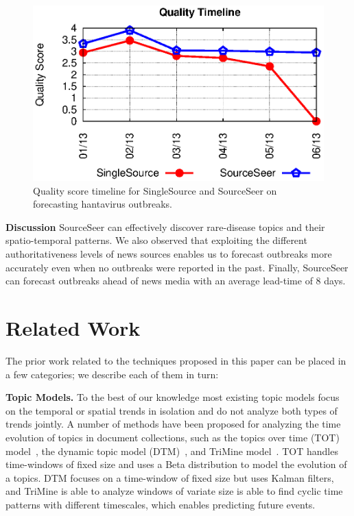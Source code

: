 \documentclass[twoside,leqno,twocolumn]{article}
\newcommand{\fullmodel}{{{\sf SourceSeer}}\xspace}
\newcommand{\fullsingle}{{{\sf SingleSource}}\xspace}
\begin{document}
\begin{figure} [h]
\begin{center}
	\includegraphics[clip,scale=0.6]{fig/quality_bench.eps}
\end{center}
\caption{Quality score timeline for \fullsingle and \fullmodel on forecasting hantavirus outbreaks.}
 \label{fig:bench_qual}
\end{figure}


\vspace{2pt}\noindent\textbf{Discussion}
\fullmodel can effectively discover rare-disease topics and their spatio-temporal patterns. We also observed that exploiting the different authoritativeness levels of news sources enables us to forecast outbreaks more accurately even when no outbreaks were reported in the past. Finally, \fullmodel can forecast outbreaks ahead of news media with an average lead-time of 8 days.

\section{Related Work}
\label{sec:related_work}
The prior work related to the techniques proposed in this paper can be placed in a few categories; we describe each of them in turn:

\vspace{5pt}\noindent\textbf{Topic Models.} To the best of our knowledge most existing topic models focus on the temporal or spatial trends in isolation and do not analyze both types of trends jointly.  A number of methods have been proposed for analyzing the time evolution of topics in document collections, such as the topics over time (TOT) model~\cite{wang:2006}, the dynamic topic model (DTM)~\cite{blei:2006}, and TriMine model~\cite{matsubara:2012}. TOT handles time-windows of fixed size and uses a Beta distribution to model the evolution of a topics. DTM  focuses on a time-window of fixed size but uses Kalman filters, and TriMine is able to analyze windows of variate size is able to find cyclic time patterns with different timescales, which enables predicting future events.
\end{document}
